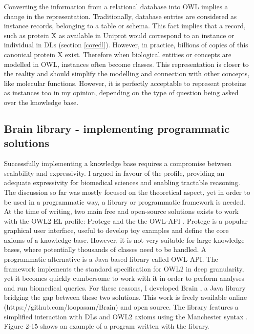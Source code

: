 Converting the information from a relational database into OWL implies a change in the representation. Traditionally, database entries are considered as instance records, belonging to a table or schema. This fact implies that a record, such as protein X as available in Uniprot would correspond to an instance or individual in DLs (section \ref{coredl}). However, in practice, billions of copies of this canonical protein X exist. Therefore when biological entities or concepts are modelled in OWL, instances often become classes. This representation is closer to the reality and should simplify the modelling and connection with other concepts, like molecular functions. However, it is perfectly acceptable to represent proteins as instances too in my opinion, depending on the type of question being asked over the knowledge base.

\subsection{Brain library - implementing programmatic solutions}

Successfully implementing a knowledge base requires a compromise between scalability and expressivity. I argued in favour of the  profile, providing an adequate expressivity for biomedical sciences and enabling tractable reasoning. The discussion so far was mostly focused on the theoretical aspect, yet in order to be used in a programmatic way, a library or programmatic framework is needed. At the time of writing, two main free and open-source solutions exists to work with the OWL2 EL profile: Protege \citep{knublauch2005protege} and the the OWL-API \citep{horridge2011owl}. Protege is a popular graphical user interface, useful to develop toy examples and define the core axioms of a knowledge base. However, it is not very suitable for large knowledge bases, where potentially thousands of classes need to be handled. A programmatic alternative is a Java-based library called OWL-API. The framework implements the standard specification for OWL2 in deep granularity, yet it becomes quickly cumbersome to work with it in order to perform analyses and run biomedical queries. For these reasons, I developed Brain \citep{croset2013brain}, a Java library bridging the gap between these two solutions. This work is freely available online (https://github.com/loopasam/Brain) and open source. The library features a simplified interaction with DLs and OWL2 axioms using the Manchester syntax \citep{horridge2006manchester}. Figure 2-15 shows an example of a program written with the library.

